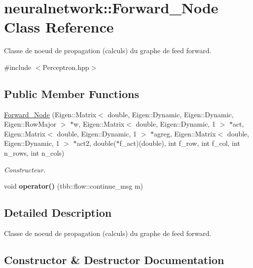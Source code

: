 \hypertarget{classneuralnetwork_1_1_forward___node}{}\section{neuralnetwork\+:\+:Forward\+\_\+\+Node Class Reference}
\label{classneuralnetwork_1_1_forward___node}


Classe de noeud de propagation (calculs) du graphe de feed forward.  




{\ttfamily \#include $<$Perceptron.\+hpp$>$}

\subsection*{Public Member Functions}
\begin{DoxyCompactItemize}
\item 
\mbox{\hyperlink{classneuralnetwork_1_1_forward___node_a94aaa066ad24fdbb48e524abf4759400}{Forward\+\_\+\+Node}} (Eigen\+::\+Matrix$<$ double, Eigen\+::\+Dynamic, Eigen\+::\+Dynamic, Eigen\+::\+Row\+Major $>$ $\ast$w, Eigen\+::\+Matrix$<$ double, Eigen\+::\+Dynamic, 1 $>$ $\ast$act, Eigen\+::\+Matrix$<$ double, Eigen\+::\+Dynamic, 1 $>$ $\ast$agreg, Eigen\+::\+Matrix$<$ double, Eigen\+::\+Dynamic, 1 $>$ $\ast$act2, double($\ast$f\+\_\+act)(double), int f\+\_\+row, int f\+\_\+col, int n\+\_\+rows, int n\+\_\+cols)
\begin{DoxyCompactList}\small\item\em Constructeur. \end{DoxyCompactList}\item 
\mbox{\label{classneuralnetwork_1_1_forward___node_aecb0098b44e7f7ef31490b8a1f63f1b4}} 
void {\bfseries operator()} (tbb\+::flow\+::continue\+\_\+msg m)
\end{DoxyCompactItemize}


\subsection{Detailed Description}
Classe de noeud de propagation (calculs) du graphe de feed forward. 

\subsection{Constructor \& Destructor Documentation}
\mbox{\label{classneuralnetwork_1_1_forward___node_a94aaa066ad24fdbb48e524abf4759400}} 
